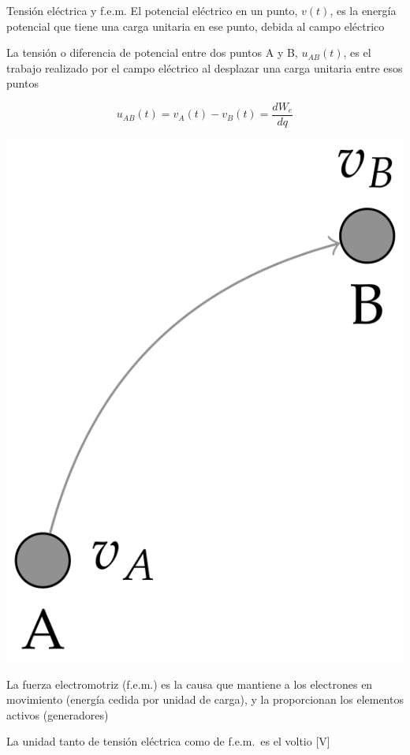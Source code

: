 \documentclass[aspectratio=169, xcolor={usenames,svgnames,dvipsnames}]{beamer}
\begin{document}
\begin{frame}{Tensión eléctrica y f.e.m.}
    El \alert{potencial eléctrico en un punto}, \(v(t)\),  es la energía potencial que tiene una carga unitaria en ese punto, debida al campo eléctrico
    
    La \alert{tensión} o \alert{diferencia de potencial entre dos puntos} A y B, \(u_{AB}(t)\), es el trabajo realizado por el campo eléctrico al desplazar una carga unitaria entre esos puntos
    
    \begin{minipage}[c]{0.5\linewidth}
    \begin{equation*}
      u_{AB}(t) = v_A(t) - v_B(t) = \frac{dW_{e}}{dq}
    \end{equation*}
    \end{minipage}
    \hfill
    \begin{minipage}[c]{0.4\linewidth}
    \begin{center}
    \includegraphics[height=0.3\textheight]{../figs/tension_puntos.PNG}
    \end{center}
    \end{minipage}
    
    La \alert{fuerza electromotriz} (f.e.m.) es la causa que mantiene a los electrones en movimiento (energía cedida por unidad de carga), y la proporcionan los elementos activos (\alert{generadores})
    
    La \alert{unidad} tanto de tensión eléctrica como de f.e.m.~es el \alert{voltio} [V]
\end{frame}
\end{document}
